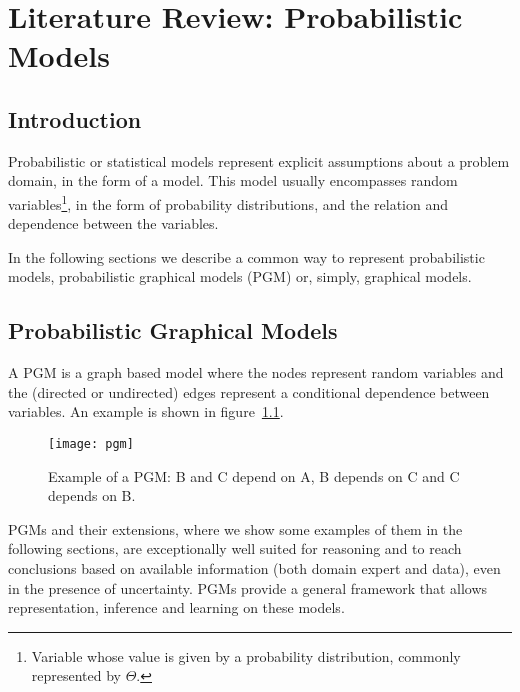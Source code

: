 \chapter{Literature Review: Probabilistic Models} \label{chap:models}

\section*{}

\section{Introduction}

Probabilistic or statistical models represent explicit assumptions about a 
problem domain, in the form of a model. This model usually encompasses random 
variables\footnote{Variable whose value is given by a probability distribution, 
commonly represented by $\Theta$.}, in the form of probability distributions, 
and the relation and dependence between the variables.~\cite{Winn2013}

In the following sections we describe a common way to represent probabilistic models, probabilistic graphical models (PGM) or, simply, graphical models.

\section{Probabilistic Graphical Models}

A PGM is a graph based model where the nodes represent random variables and the 
(directed or undirected) edges represent a conditional dependence between 
variables. An example is shown in figure~\ref{fig:pgm}.

\begin{figure}[h]
	\begin{center}
		\leavevmode
		\texttt{[image: pgm]}
		\caption{Example of a PGM: B and C depend on A, B depends on C and C 
		depends on B.}
		\label{fig:pgm}
	\end{center}
\end{figure}

PGMs and their extensions, where we show some examples of them in the following 
sections, are exceptionally well suited for reasoning and to reach conclusions 
based on available information (both domain expert and data), even in the 
presence of uncertainty. PGMs provide a general framework that allows 
representation, inference and learning on these 
models.~\cite{koller2009probabilistic}

